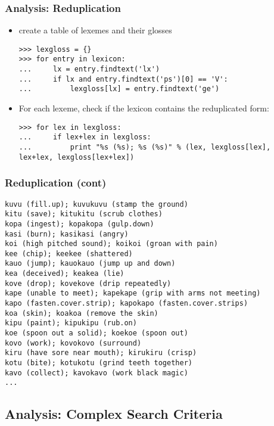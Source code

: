 \documentclass{beamer}             %
\begin{document}
\begin{frame}[fragile]
\frametitle{Analysis: Reduplication}
\scriptsize
\begin{itemize}
\item create a table of lexemes and their glosses

\begin{verbatim}
>>> lexgloss = {}
>>> for entry in lexicon:
...     lx = entry.findtext('lx')
...     if lx and entry.findtext('ps')[0] == 'V':
...         lexgloss[lx] = entry.findtext('ge')
\end{verbatim}

\item For each lexeme, check if the lexicon contains the reduplicated form:

\begin{verbatim}
>>> for lex in lexgloss:
...     if lex+lex in lexgloss:
...         print "%s (%s); %s (%s)" % (lex, lexgloss[lex], lex+lex, lexgloss[lex+lex])
\end{verbatim}
\end{itemize}
\end{frame}

\begin{frame}[fragile]
\frametitle{Reduplication (cont)}
\scriptsize
\begin{verbatim}
kuvu (fill.up); kuvukuvu (stamp the ground)
kitu (save); kitukitu (scrub clothes)
kopa (ingest); kopakopa (gulp.down)
kasi (burn); kasikasi (angry)
koi (high pitched sound); koikoi (groan with pain)
kee (chip); keekee (shattered)
kauo (jump); kauokauo (jump up and down)
kea (deceived); keakea (lie)
kove (drop); kovekove (drip repeatedly)
kape (unable to meet); kapekape (grip with arms not meeting)
kapo (fasten.cover.strip); kapokapo (fasten.cover.strips)
koa (skin); koakoa (remove the skin)
kipu (paint); kipukipu (rub.on)
koe (spoon out a solid); koekoe (spoon out)
kovo (work); kovokovo (surround)
kiru (have sore near mouth); kirukiru (crisp)
kotu (bite); kotukotu (grind teeth together)
kavo (collect); kavokavo (work black magic)
...
\end{verbatim}
\end{frame}

\subsection{Analysis: Complex Search Criteria}
\end{document}
